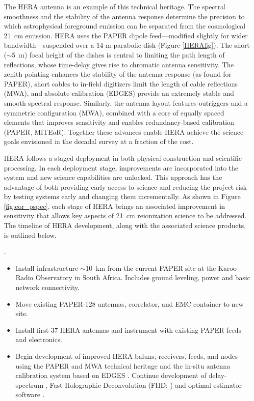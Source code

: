 \documentclass[preprint]{aastex}
\begin{document}
The HERA antenna is an example of this technical heritage. The spectral
smoothness and the stability of the antenna response determine the precision to
which astrophysical foreground emission can be separated from the cosmological
21~cm emission. HERA uses the PAPER dipole feed---modified slightly for wider
bandwidth---suspended over a 14-m parabolic dish (Figure \ref{HERAfig}). The
short ($\sim$5~m) focal height of the dishes is central to limiting the path
length of reflections, whose time-delay gives rise to chromatic antenna
sensitivity. The zenith pointing enhances the stability of the antenna response
(as found for PAPER), short cables to in-field digitizers limit the length of cable
reflections (MWA), and absolute calibration (EDGES) provide
an extremely stable and smooth spectral response. Similarly, the antenna layout
features outriggers and a symmetric configuration (MWA),
combined with a core of equally spaced elements that improves sensitivity
and enables redundancy-based calibration (PAPER, MITEoR). Together
these advances enable HERA achieve the science goals envisioned in the decadal
survey at a fraction of the cost. %

HERA follows a staged deployment in both physical construction and scientific processing.  In
each deployment stage, improvements are incorporated into the system and new
science capabilities are unlocked.  This approach has the advantage of both
providing early access to science and reducing the project risk by testing systems
early and changing them incrementally.  As shown in Figure \ref{fig:eor_pspec}, each
stage of HERA brings an associated improvement in sensitivity that allows key
aspects of 21~cm reionization science to be addressed.  The timeline of HERA
development, along with the associated science products, is outlined below. 

.  
\begin{itemize}\setlength{\parskip}{0pt}\itemsep0pt
\vspace{-7pt}
  \item Install infrastructure $\sim$10~km from the current PAPER site at the Karoo Radio Observatory in South Africa. Includes ground leveling, power and basic network connectivity.
  \item Move existing PAPER-128 antennas, correlator, and EMC container to new site.
  \item Install first 37 HERA antennas and instrument with existing PAPER feeds and electronics. 
  \item Begin development of improved HERA baluns, receivers, feeds, and 
nodes using the PAPER and MWA technical heritage \citep{bradley_et_al2005,lonsdale_et_al2009_trunc,tingay_et_al2013_trunc} 
and the in-situ antenna calibration system based 
on EDGES \citep{rogers_2012}. Continue development of delay-spectrum \citep{parsons_et_al2012b}, 
Fast Holographic Deconvolution (FHD; \citealt{sullivan_et_al2012_trunc}) and 
optimal estimator software \citep{dillon_et_al2013b_trunc}.
\end{itemize}
\end{document}
